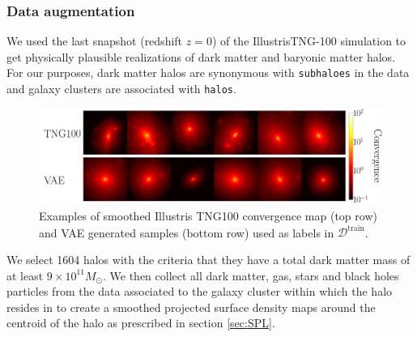 \documentclass[twocolumn]{aastex631}
\begin{document}
\subsubsection{Data augmentation}
We used the last snapshot (redshift $z=0$) 
of the IllustrisTNG-100 simulation \citep{Nelson2018} to get 
physically plausible realizations of dark matter and baryonic matter halos.
For our purposes, dark matter halos are synonymous with \texttt{subhaloes} in the data and 
galaxy clusters are associated with \texttt{halos}. %

\begin{figure}
        \centering
        \includegraphics[width=\linewidth]{figures/kap_vae_sample}
        \caption{Examples of smoothed Illustris TNG100 convergence map (top row) 
        and VAE generated samples (bottom row) used as labels in $\mathcal{D}^{\mathrm{train}}$.}
        \label{fig:kappa}
\end{figure}

We select 1604 halos with the criteria that they have a total
dark matter mass of at least $9\times10^{11} M_{\odot}$. We then collect all 
dark matter, gas, stars and black holes particles from the data associated to the galaxy 
cluster within which the halo resides in to create a smoothed projected surface density maps 
around the centroid of the halo as prescribed in section \ref{sec:SPL}.
\end{document}
